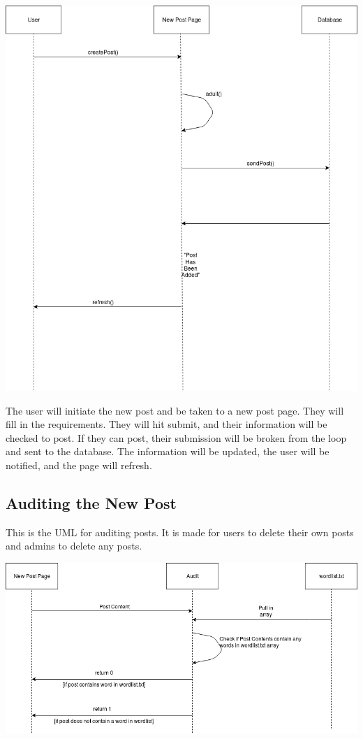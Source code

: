 \documentclass[12pt]{article}
\begin{document}
\includegraphics[scale=0.50]{img/uml/createPost}

The user will initiate the new post and be taken to a new post page. They will fill in the requirements. They will hit submit, and their information will be checked to post. If they can post, their submission will be broken from the loop and sent to the database. The information will be updated, the user will be notified, and the page will refresh.
\subsection{Auditing the New Post}
This is the UML for auditing posts. It is made for users to delete their own posts and admins to delete any posts.

\includegraphics[scale=0.50]{img/uml/audit}
\end{document}
